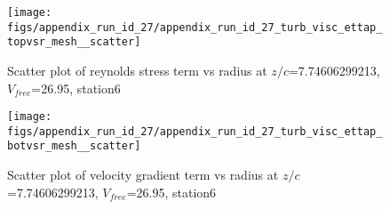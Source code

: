 \begin{figure}[H]
\centering
\texttt{[image: figs/appendix\_run\_id\_27/appendix\_run\_id\_27\_turb\_visc\_ettap\_topvsr\_mesh\_\_scatter]}
\caption{Scatter plot of reynolds stress term vs radius at $z/c$=7.74606299213, $V_{free}$=26.95, station6}
\label{fig:appendix_run_id_27_turb_visc_ettap_topvsr_mesh__scatter}
\end{figure}


\begin{figure}[H]
\centering
\texttt{[image: figs/appendix\_run\_id\_27/appendix\_run\_id\_27\_turb\_visc\_ettap\_botvsr\_mesh\_\_scatter]}
\caption{Scatter plot of velocity gradient term vs radius at $z/c$=7.74606299213, $V_{free}$=26.95, station6}
\label{fig:appendix_run_id_27_turb_visc_ettap_botvsr_mesh__scatter}
\end{figure}


